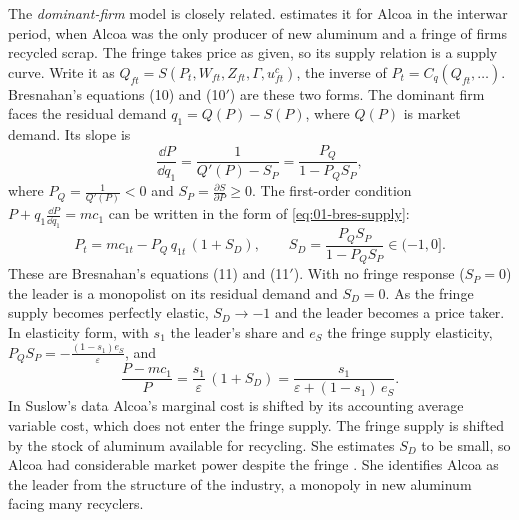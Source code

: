 The \emph{dominant-firm} model is closely related. \citet{Suslow1986} estimates it for Alcoa in the interwar period,
when Alcoa was the only producer of new aluminum and a fringe of firms recycled scrap. The fringe takes price as given,
so its supply relation is a supply curve. Write it as $Q_{ft} = S(P_t, W_{ft}, Z_{ft}, \Gamma, u^c_{ft})$, the inverse
of $P_t = C_q(Q_{ft}, \dots)$. Bresnahan's equations (10) and (10$'$) are these two forms. The dominant firm faces the
residual demand $q_1 = Q(P) - S(P)$, where $Q(P)$ is market demand. Its slope is
\begin{equation*}
\frac{\dd P}{\dd q_1} = \frac{1}{Q'(P) - S_P} = \frac{P_Q}{1 - P_Q S_P},
\end{equation*}
where $P_Q = \frac{1}{Q'(P)} < 0$ and $S_P = \frac{\partial S}{\partial P} \ge 0$. The first-order condition
$P + q_1\frac{\dd P}{\dd q_1} = mc_1$ can be written in the form of \eqref{eq:01-bres-supply}:
\begin{equation}\label{eq:01-dominant}
P_t = mc_{1t} - P_Q\,q_{1t}\,(1 + S_D), \qquad S_D = \frac{P_Q S_P}{1 - P_Q S_P} \in (-1, 0].
\end{equation}
These are Bresnahan's equations (11) and (11$'$). With no fringe response ($S_P = 0$) the leader is a monopolist on its residual demand and $S_D = 0$. As the fringe supply becomes
perfectly elastic, $S_D \to -1$ and the leader becomes a price taker. In elasticity form, with $s_1$ the leader's share
and $e_S$ the fringe supply elasticity, $P_Q S_P = -\frac{(1 - s_1)e_S}{\varepsilon}$, and
\begin{equation*}
\frac{P - mc_1}{P} = \frac{s_1}{\varepsilon}\,(1 + S_D) = \frac{s_1}{\varepsilon + (1 - s_1)\,e_S} .
\end{equation*}
In Suslow's data Alcoa's marginal cost is shifted by its accounting average variable cost, which does not enter the fringe
supply. The fringe supply is shifted by the stock of aluminum available for recycling. She estimates $S_D$ to be small, so
Alcoa had considerable market power despite the fringe \citep[p.~1023]{Bresnahan1989}. She identifies Alcoa as the
leader from the structure of the industry, a monopoly in new aluminum facing many recyclers.

